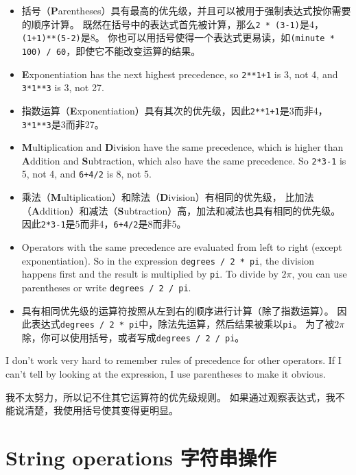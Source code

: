 \documentclass[10pt]{book}
\begin{document}
\begin{CJK}{UTF8}{gbsn}
\begin{itemize}
\item 括号（{\bf P}arentheses）具有最高的优先级，并且可以被用于强制表达式按你需要的顺序计算。
既然在括号中的表达式首先被计算，那么{\tt 2 * (3-1)}是4，{\tt (1+1)**(5-2)}是8。
你也可以用括号使得一个表达式更易读，如{\tt (minute * 100) / 60}，即使它不能改变运算的结果。

\item {\bf E}xponentiation has the next highest precedence, so
{\tt 2**1+1} is 3, not 4, and {\tt 3*1**3} is 3, not 27.

\item 指数运算（{\bf E}xponentiation）具有其次的优先级，因此{\tt 2**1+1}是3而非4，
{\tt 3*1**3}是3而非27。

\item {\bf M}ultiplication and {\bf D}ivision have the same precedence,
which is higher than {\bf A}ddition and {\bf S}ubtraction, which also
have the same precedence.  So {\tt 2*3-1} is 5, not 4, and
{\tt 6+4/2} is 8, not 5.

\item 乘法（{\bf M}ultiplication）和除法（{\bf D}ivision）有相同的优先级，
比加法（{\bf A}ddition）和减法（{\bf S}ubtraction）高，加法和减法也具有相同的优先级。
因此{\tt 2*3-1}是5而非4，{\tt 6+4/2}是8而非5。

\item Operators with the same precedence are evaluated from left to
  right (except exponentiation).  So in the expression {\tt degrees /
    2 * pi}, the division happens first and the result is multiplied
  by {\tt pi}.  To divide by $2 \pi$, you can use parentheses or write
  {\tt degrees / 2 / pi}.
  
\item 具有相同优先级的运算符按照从左到右的顺序进行计算（除了指数运算）。
因此表达式{\tt degrees / 2 * pi}中，除法先运算，然后结果被乘以{\tt pi}。
为了被$2 \pi$除，你可以使用括号，或者写成{\tt degrees / 2 / pi}。

\end{itemize}

I don't work very hard to remember rules of precedence for other
operators.  If I can't tell by looking at the expression, I use
parentheses to make it obvious.

我不太努力，所以记不住其它运算符的优先级规则。
如果通过观察表达式，我不能说清楚，我使用括号使其变得更明显。

\section{String operations 字符串操作}


\end{CJK}
\end{document}
